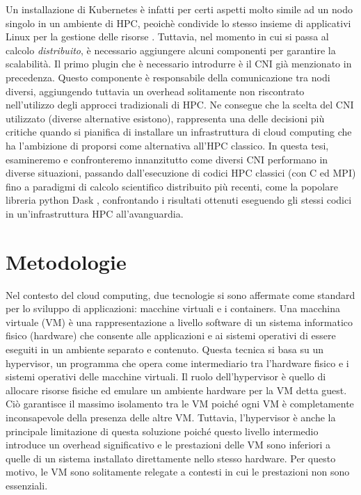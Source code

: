 Un installazione di Kubernetes è infatti per certi aspetti molto simile ad un
nodo singolo in un ambiente di HPC, peoichè condivide lo stesso insieme di
applicativi Linux per la gestione delle risorse \cite{jain2023}. Tuttavia, nel
momento in cui si passa al calcolo \textit{distribuito}, è necessario aggiungere
alcuni componenti per garantire la scalabilità.
Il primo plugin che è necessario introdurre è il CNI già menzionato in
precedenza. Questo componente è responsabile della comunicazione tra nodi
diversi, aggiungendo tuttavia un overhead solitamente non riscontrato
nell'utilizzo degli approcci tradizionali di HPC.
Ne consegue che la scelta del CNI utilizzato (diverse alternative esistono),
rappresenta una delle decisioni più critiche quando si pianifica di installare
un infrastruttura di cloud computing che ha l'ambizione di proporsi come
alternativa all'HPC classico.
In questa tesi, esamineremo e confronteremo innanzitutto come diversi CNI
performano in diverse situazioni, passando dall'esecuzione di codici HPC
classici (con C ed MPI) fino a paradigmi di calcolo scientifico distribuito più
recenti, come la popolare libreria python Dask \cite{dask2015}, confrontando i
risultati ottenuti eseguendo gli stessi codici in un'infrastruttura HPC
all'avanguardia.



\section*{Metodologie}


Nel contesto del cloud computing, due tecnologie si sono affermate come standard
per lo sviluppo di applicazioni: macchine virtuali e i containers.
Una macchina virtuale (VM) è una rappresentazione a livello software di un
sistema informatico fisico (hardware) che consente alle applicazioni e ai
sistemi operativi di essere eseguiti in un ambiente separato e contenuto.
Questa tecnica si basa su un hypervisor, un programma che opera come
intermediario tra l'hardware fisico e i sistemi operativi delle macchine virtuali.
Il ruolo dell'hypervisor è quello di allocare risorse fisiche ed emulare un
ambiente hardware per la VM detta guest.
Ciò garantisce il massimo isolamento tra le VM poiché ogni VM è completamente
inconsapevole della presenza delle altre VM.
Tuttavia, l'hypervisor è anche la principale limitazione di questa soluzione
poiché questo livello intermedio introduce un overhead significativo e le
prestazioni delle VM sono inferiori a quelle di un sistema installato
direttamente nello stesso hardware.
Per questo motivo, le VM sono solitamente relegate a contesti in cui le
prestazioni non sono essenziali.

